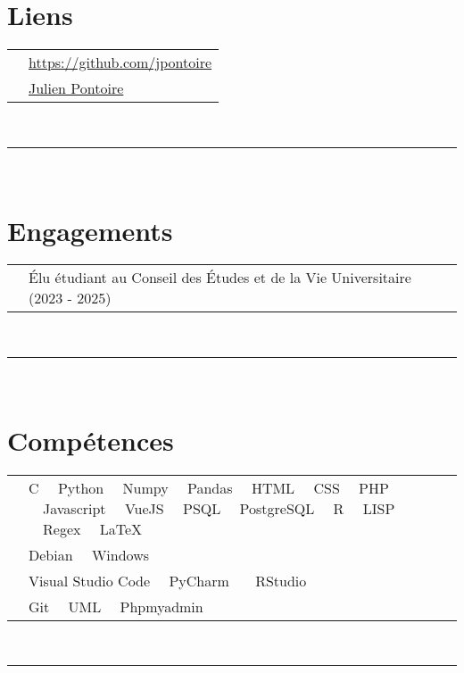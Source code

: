 \documentclass[oneside]{article}
\begin{document}
{\begin{minipage}[t][\textheight-2\fboxsep-2\fboxrule][t]{\dimexpr0.40\textwidth-2\fboxrule-2\fboxsep\relax}
        \section*{\large Liens}
        \begin{tabular}{cl}
            \faGithub{}   & \href{https://github.com/jpontoire}{https://github.com/jpontoire} \\
            \faLinkedin{} & \href{https://www.linkedin.com/in/julien-pontoire-0a50a42b1/}{Julien Pontoire} \\
        \end{tabular}
        \vspace{10pt} \\
        \rule{\linewidth}{0.4pt} \\

        \section*{\large Engagements}
        \begin{tabularx}{\textwidth}{cY}
            & Élu étudiant au Conseil des Études et de la Vie Universitaire (2023 - 2025)
        \end{tabularx}
        \vspace{7pt} \\
        \rule{\linewidth}{0.4pt} \\
        \section*{\large Compétences}
        \begin{tabularx}{\textwidth}{cY}
            \faCode{}        & C \ \ Python \ \ Numpy \ \ Pandas \ \ HTML \ \ CSS \ \ PHP \ \ Javascript \ \ VueJS \ \ PSQL \ \ PostgreSQL \ \ R \ \ LISP \ \ Regex \ \ LaTeX \\
            \faCogs{}        & Debian \ \ Windows \\
            \faLaptopCode{}  & Visual Studio Code \ \ PyCharm \ \ \ RStudio \\
            \faToolbox{}     & Git \ \ UML \ \ Phpmyadmin
        \end{tabularx}
        \vspace{1pt} \\
        \rule{\linewidth}{0.4pt}
        

\end{minipage}}
\end{document}
